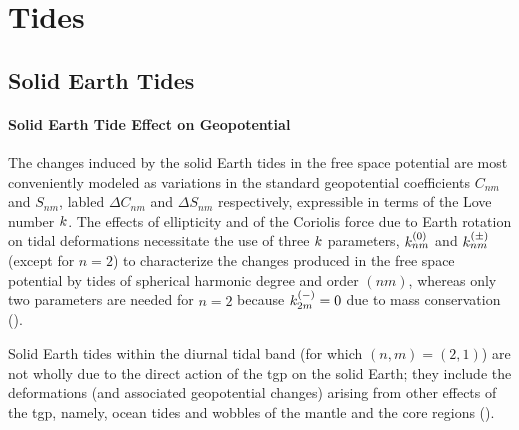 \chapter{Tides}
\label{ch:tides}

\section{Solid Earth Tides}
\label{sec:solid-earth-tides}

\subsubsection{Solid Earth Tide Effect on Geopotential}
\label{sssec:solid-earth-tide-geopotential}
The changes induced by the solid Earth tides in the free space potential are 
most conveniently modeled as variations in the standard geopotential 
coefficients $C_{nm}$ and $S_{nm}$, labled $\Delta C_{nm}$ and $\Delta S_{nm}$ 
respectively, expressible in terms of the Love number $k$. The effects of 
ellipticity and of the Coriolis force due to Earth rotation on tidal 
deformations necessitate the use of three $k$ parameters, $k ^{(0)}_{nm}$ 
and $k ^{(\pm)}_{nm}$ (except for $n = 2$) to characterize the
changes produced in the free space potential by tides of spherical harmonic 
degree and order $(nm)$, whereas only two parameters are needed for $n = 2$ 
because $k ^{(-)}_{2m} = 0$ due to mass conservation (\cite{iers2010}).

Solid Earth tides within the diurnal tidal band (for which $(n,m) = (2,1)$) are 
not wholly due to the direct action of the \gls{tgp} on the solid Earth; they 
include the deformations (and associated geopotential changes) arising from 
other effects of the \gls{tgp}, namely, ocean tides and wobbles of the mantle 
and the core regions (\cite{iers2010}).

